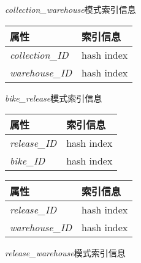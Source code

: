   \begin{figure}[!htp]
    \begin{minipage}{0.3\textwidth}
      \centering
      \caption{\textit{collection\_warehouse}模式索引信息}
      \label{tab:indexcollectionwarehouse}
      \begin{tabular}{ll}\toprule
        属性&索引信息\\\midrule
       \textit{collection\_ID}&hash index\\
       \textit{warehouse\_ID}&hash index\\
       \bottomrule
      \end{tabular}
    \end{minipage}\hfill
    \begin{minipage}{0.3\textwidth}
      \centering
      \caption{\textit{bike\_release}模式索引信息}
      \label{tab:indexbikerelease}
      \begin{tabular}{ll}\toprule
        属性&索引信息\\\midrule
       \textit{release\_ID}&hash index\\
       \textit{bike\_ID}&hash index\\
       \bottomrule
      \end{tabular}
    \end{minipage}\hfill
    \begin{minipage}{0.3\textwidth}
      \centering
      \caption{\textit{release\_warehouse}模式索引信息}
      \label{tab:indexreleasewarehouse}
      \begin{tabular}{ll}\toprule
        属性&索引信息\\\midrule
       \textit{release\_ID}&hash index\\
       \textit{warehouse\_ID}&hash index\\
       \bottomrule
      \end{tabular}
    \end{minipage}\hfill
  \end{figure}
